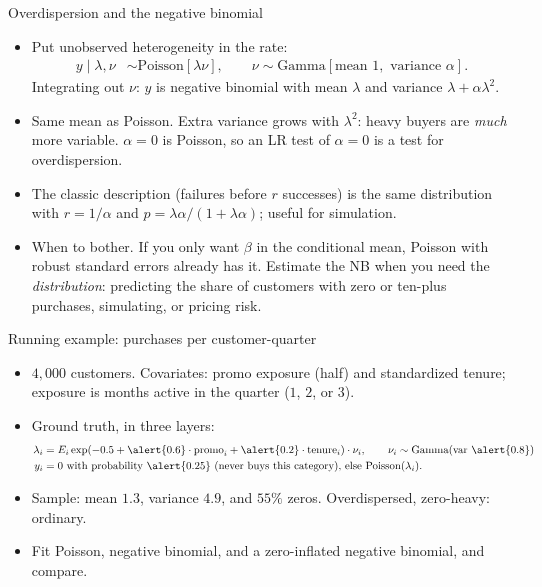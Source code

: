 \documentclass[aspectratio=169,11pt]{beamer}
\begin{document}
\begin{frame}{Overdispersion and the negative binomial}
\begin{itemize}
\item  Put unobserved heterogeneity in the rate:
\begin{align*}
	y \mid \lambda, \nu & \sim \text{Poisson}\left[\lambda \nu \right], \qquad
	\nu \sim \text{Gamma}\left[\text{mean } 1, \text{ variance } \alpha \right].
\end{align*}
	Integrating out $\nu$: $y$ is \alert{negative binomial} with mean $\lambda$ and variance $\lambda + \alpha\lambda^2$.
	\medskip
	\item Same mean as Poisson. Extra variance grows with $\lambda^2$: heavy buyers are \emph{much} more
	variable. $\alpha = 0$ is Poisson, so an LR test of $\alpha = 0$ is a test for overdispersion.
	\medskip
	\item The classic description (failures before $r$ successes) is the same distribution with
	$r = 1/\alpha$ and $p = \lambda\alpha/(1 + \lambda\alpha)$; useful for simulation.
	\medskip
	\item \alert{When to bother.} If you only want $\beta$ in the conditional mean, Poisson with robust
	standard errors already has it. Estimate the NB when you need the \emph{distribution}: predicting the
	share of customers with zero or ten-plus purchases, simulating, or pricing risk.
\end{itemize}
\end{frame}


\begin{frame}{Running example: purchases per customer-quarter}
\begin{itemize}
	\item $4{,}000$ customers. Covariates: \alert{promo} exposure (half) and standardized \alert{tenure};
	exposure is months active in the quarter ($1$, $2$, or $3$).
	\medskip
	\item Ground truth, in three layers:
	\begin{align*}
		\lambda_i &= E_i \exp(-0.5 + \alert{0.6}\cdot\text{promo}_i + \alert{0.2}\cdot\text{tenure}_i)\cdot \nu_i,
		\qquad \nu_i \sim \text{Gamma}(\text{var } \alert{0.8}) \\
		y_i &= 0 \text{ with probability } \alert{0.25} \text{ (never buys this category), else Poisson}(\lambda_i).
	\end{align*}
	\medskip
	\item Sample: mean $1.3$, variance $4.9$, and $55\%$ zeros. Overdispersed, zero-heavy: ordinary.
	\medskip
	\item Fit Poisson, negative binomial, and a zero-inflated negative binomial, and compare.
\end{itemize}
\end{frame}
\end{document}
